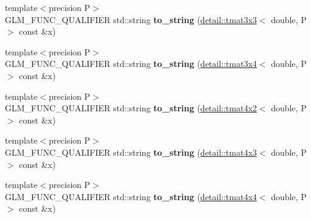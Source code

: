 \begin{DoxyCompactItemize}
\item 
{\footnotesize template$<$precision P$>$ }\\G\+L\+M\+\_\+\+F\+U\+N\+C\+\_\+\+Q\+U\+A\+L\+I\+F\+I\+ER std\+::string {\bfseries to\+\_\+string} (\hyperlink{structglm_1_1detail_1_1tmat3x3}{detail\+::tmat3x3}$<$ double, P $>$ const \&x)\hypertarget{namespaceglm_a86b22d004f70933e0e8c7c524ce203bb}{}\label{namespaceglm_a86b22d004f70933e0e8c7c524ce203bb}

\item 
{\footnotesize template$<$precision P$>$ }\\G\+L\+M\+\_\+\+F\+U\+N\+C\+\_\+\+Q\+U\+A\+L\+I\+F\+I\+ER std\+::string {\bfseries to\+\_\+string} (\hyperlink{structglm_1_1detail_1_1tmat3x4}{detail\+::tmat3x4}$<$ double, P $>$ const \&x)\hypertarget{namespaceglm_a6ca2fcca704c9d5d4038cc6c2963b5f7}{}\label{namespaceglm_a6ca2fcca704c9d5d4038cc6c2963b5f7}

\item 
{\footnotesize template$<$precision P$>$ }\\G\+L\+M\+\_\+\+F\+U\+N\+C\+\_\+\+Q\+U\+A\+L\+I\+F\+I\+ER std\+::string {\bfseries to\+\_\+string} (\hyperlink{structglm_1_1detail_1_1tmat4x2}{detail\+::tmat4x2}$<$ double, P $>$ const \&x)\hypertarget{namespaceglm_a014ab0892ae1ae60db9e0b302c509478}{}\label{namespaceglm_a014ab0892ae1ae60db9e0b302c509478}

\item 
{\footnotesize template$<$precision P$>$ }\\G\+L\+M\+\_\+\+F\+U\+N\+C\+\_\+\+Q\+U\+A\+L\+I\+F\+I\+ER std\+::string {\bfseries to\+\_\+string} (\hyperlink{structglm_1_1detail_1_1tmat4x3}{detail\+::tmat4x3}$<$ double, P $>$ const \&x)\hypertarget{namespaceglm_a8c03a32a98613acfcffa00b4a39179b2}{}\label{namespaceglm_a8c03a32a98613acfcffa00b4a39179b2}

\item 
{\footnotesize template$<$precision P$>$ }\\G\+L\+M\+\_\+\+F\+U\+N\+C\+\_\+\+Q\+U\+A\+L\+I\+F\+I\+ER std\+::string {\bfseries to\+\_\+string} (\hyperlink{structglm_1_1detail_1_1tmat4x4}{detail\+::tmat4x4}$<$ double, P $>$ const \&x)\hypertarget{namespaceglm_a70230acf5f1190df3a56efd0b112a3cc}{}\label{namespaceglm_a70230acf5f1190df3a56efd0b112a3cc}


\end{DoxyCompactItemize}
